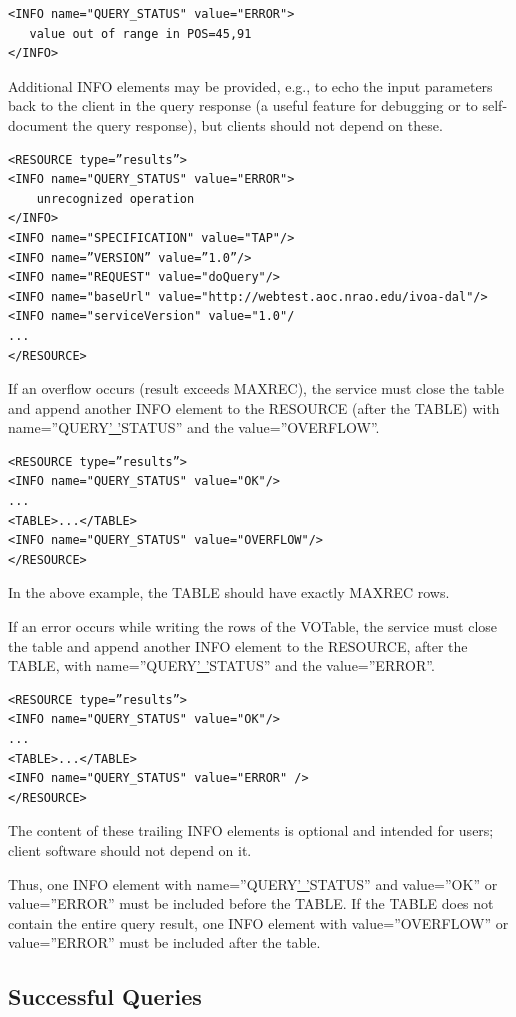 \documentclass[11pt,letter]{ivoa}
\begin{document}
{\begin{verbatim}
<INFO name="QUERY_STATUS" value="ERROR">
   value out of range in POS=45,91
</INFO>
\end{verbatim}

Additional INFO elements may be provided, e.g., to echo the input parameters 
back to the client in the query response (a useful feature for debugging or to 
self-document the query response), but clients should not depend on these. 

\begin{verbatim}
<RESOURCE type=”results”>
<INFO name="QUERY_STATUS" value="ERROR">
    unrecognized operation
</INFO>
<INFO name="SPECIFICATION" value="TAP"/>
<INFO name=”VERSION” value=”1.0”/>
<INFO name="REQUEST" value="doQuery"/>
<INFO name="baseUrl" value="http://webtest.aoc.nrao.edu/ivoa-dal"/>
<INFO name="serviceVersion" value="1.0"/
...
</RESOURCE>
\end{verbatim}

If an overflow occurs (result exceeds MAXREC), the service must close the table 
and append another INFO element to the RESOURCE (after the TABLE) with 
name=”QUERY\underline{' '}STATUS” and the value=”OVERFLOW”.
\begin{verbatim}
<RESOURCE type=”results”>
<INFO name="QUERY_STATUS" value="OK"/>
...
<TABLE>...</TABLE>
<INFO name="QUERY_STATUS" value="OVERFLOW"/>
</RESOURCE>
\end{verbatim}

In the above example, the TABLE should have exactly MAXREC rows.

If an error occurs while writing the rows of the VOTable, the service must 
close the table and append another INFO element to the RESOURCE, after the 
TABLE, with name=”QUERY\underline{' '}STATUS” and the value=”ERROR”.
\begin{verbatim}
<RESOURCE type=”results”>
<INFO name="QUERY_STATUS" value="OK"/>
...
<TABLE>...</TABLE>
<INFO name="QUERY_STATUS" value="ERROR" />
</RESOURCE>
\end{verbatim}
The content of these trailing INFO elements is optional and intended for users; 
client software should not depend on it.

Thus, one INFO element with name=”QUERY\underline{' '}STATUS” and value=”OK” or 
value=”ERROR” must be included before the TABLE. If the TABLE does not contain 
the entire query result, one INFO element with value=”OVERFLOW” or 
value=”ERROR” must be included after the table. 

\subsection{Successful Queries}
\label{sec:query-ok}

}
\end{document}
